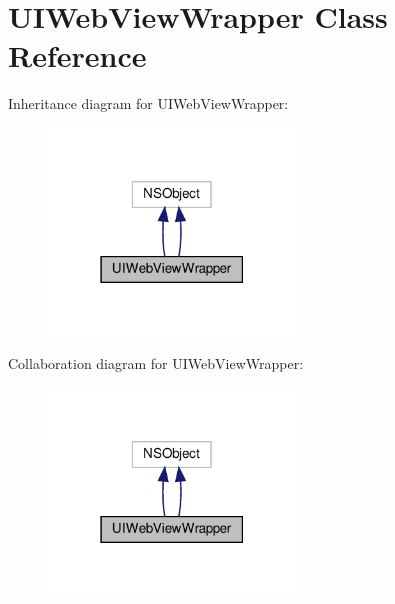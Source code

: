 \hypertarget{interfaceUIWebViewWrapper}{}\section{U\+I\+Web\+View\+Wrapper Class Reference}
\label{interfaceUIWebViewWrapper}


Inheritance diagram for U\+I\+Web\+View\+Wrapper\+:
\nopagebreak
\begin{figure}[H]
\begin{center}
\leavevmode
\includegraphics[width=186pt]{interfaceUIWebViewWrapper__inherit__graph}
\end{center}
\end{figure}


Collaboration diagram for U\+I\+Web\+View\+Wrapper\+:
\nopagebreak
\begin{figure}[H]
\begin{center}
\leavevmode
\includegraphics[width=186pt]{interfaceUIWebViewWrapper__coll__graph}
\end{center}
\end{figure}
